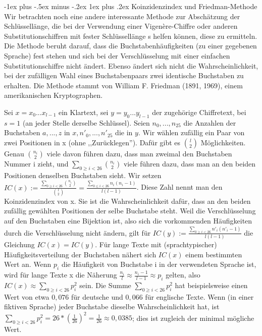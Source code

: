 \documentclass[a4paper]{article}
\makeatletter
\renewcommand{\subsubsection}{\@startsection{subsubsection}{3}{0mm}%
 {-1ex plus -.5ex minus -.2ex}%
 {1ex plus .2ex}%
 {\normalfont\small\bfseries}}
\makeatother
\begin{document}
\begin{multicols}{3}
    \subsubsection{Koinzidenzindex und Friedman-Methode}
    Wir betrachten noch eine andere interessante Methode zur Abschätzung der Schlüssellänge, die bei der Verwendung einer Vigenère-Chiffre oder anderen Substitutionschiffren mit fester Schlüssellänge s helfen können, diese zu ermitteln. Die Methode beruht darauf, dass die Buchstabenhäufigkeiten (zu einer gegebenen Sprache) fest stehen und sich bei der Verschlüsselung mit einer einfachen Substitutionschiffre nicht ändert. Ebenso ändert sich nicht die Wahrscheinlichkeit, bei der zufälligen Wahl eines Buchstabenpaars zwei identische Buchstaben zu erhalten. Die Methode stammt von William F. Friedman (1891, 1969), einem amerikanischen Kryptographen.

    Sei $x=x_0...x_{l-1}$ ein Klartext, sei $y=y_0...y_{l-1}$ der zugehörige Chiffretext, bei $s=1$ (an jeder Stelle derselbe Schlüssel). Seien $n_0,...,n_{25}$ die Anzahlen der Buchstaben $a,...,z$ in $x,n'_0,...,n'_25$ die in $y$. Wir wählen zufällig ein Paar von zwei Positionen in x (ohne ,,Zurücklegen''). Dafür gibt es $\binom{l}{2}$ Möglichkeiten. Genau $\binom{n_i}{2}$ viele davon führen dazu, dass man zweimal den Buchstaben Nummer i zieht, und $\sum_{0\geq i<26}\binom{n_i}{2}$ viele führen dazu, dass man an den beiden Positionen denselben Buchstaben sieht. Wir setzen $IC(x):=\frac{\sum_{0\geq i<26}\binom{n_i}{2}}{\binom{l}{2}}=\frac{\sum_{0\leq i<26}n_i(n_i-1)}{l(l-1)}$.
    Diese Zahl nennt man den Koinzidenzindex von x. Sie ist die Wahrscheinlichkeit dafür, dass an den beiden zufällig gewählten Positionen der selbe Buchstabe steht. Weil die Verschlüsselung auf den Buchstaben eine Bijektion ist, also sich die vorkommenden Häufigkeiten durch die Verschlüsselung nicht ändern, gilt für $IC(y):=\frac{\sum_{0\geq i<26} n'_i(n'_i -1)}{l(l-1)}$ die Gleichung $IC(x)=IC(y)$.
    Für lange Texte mit (sprachtypischer) Häufigkeitsverteilung der Buchstaben nähert sich $IC(x)$ einem bestimmten Wert an. Wenn $p_i$ die Häufigkeit von Buchstabe i in der verwendeten Sprache ist, wird für lange Texte x die Näherung $\frac{n_i}{l}\approx\frac{n_i-1}{l-1}\approx p_i$ gelten, also $IC(x)\approx \sum_{0\geq i<26} p^2_i$ sein. Die Summe $\sum_{0\geq i<26} p^2_i$ hat beispielsweise einen Wert von etwa $0,076$ für deutsche und $0,066$ für englische Texte. Wenn (in einer fiktiven Sprache) jeder Buchstabe dieselbe Wahrscheinlichkeit hat, ist $\sum_{0\geq i<26} p^2_i= 26*(\frac{1}{26})^2=\frac{1}{26}\approx 0,0385$; dies ist zugleich der minimal mögliche Wert.


\end{multicols}
\end{document}
